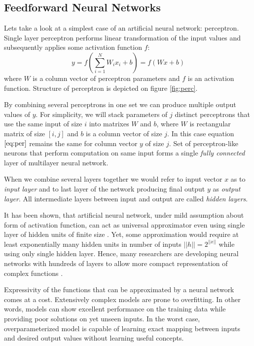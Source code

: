 \subsection{Feedforward Neural Networks}
\label{ch:ffnn}

Lets take a look at a simplest case of an artificial neural network: perceptron.
Single layer perceptron performs linear transformation of the input values and subsequently applies some activation function $f$:
\begin{equation}\label{eq:per}
  y = f(\sum_{i=1}^N W_ix_i + b) = f(Wx+b)
\end{equation}
where $W$ is a column vector of perceptron parameters and $f$ is an activation function. Structure of perceptron is depicted on figure \ref{fig:perc}.



By combining several perceptrons in one set we can produce multiple output values of $y$.
For simplicity, we will stack parameters of $j$ distinct perceptrons that use the same input of size $i$ into matrixes $W$ and $b$, where $W$ is rectangular matrix of size $[i,j]$ and $b$ is a column vector of size $j$.
In this case equation $\ref{eq:per}$ remains the same for column vector $y$ of size $j$. Set of perceptron-like neurons that perform computation on same input forms a single \textit{fully connected} layer of multilayer neural network.

When we combine several layers together we would refer to input vector $x$ as to \textit{input layer} and to last layer of the network producing final output $y$ as \textit{output layer}. All intermediate layers between input and output are called \textit{hidden layers}.

It has been shown, that artificial neural network, under mild assumption about form of activation function, can act as universal approximator even using single layer of hidden units of finite size \cite{Debao1993}. Yet, some approximation would require at least exponentially many hidden units in number of inputs $||h||=2^{||x||}$ \cite{Pascanu2014} while using only single hidden layer.
Hence, many researchers are developing neural networks with hundreds of layers to allow more compact representation of complex functions \cite{He2015, Srivastava2015}.

Expressivity of the functions that can be approximated by a neural network comes at a cost.
Extensively complex models are prone to overfitting. In other words, models can show excellent performance on the training data while providing poor solutions on yet unseen inputs. In the worst case, overparameterized model is capable of learning exact mapping between inputs and desired output values without learning useful concepts.

